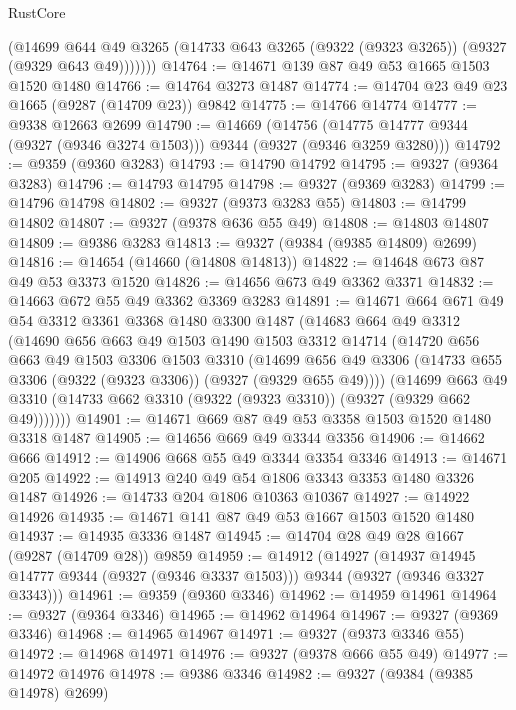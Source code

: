 \begin{lexlean}{RustCore}
\begin{coremodule}
          (@14699
            @644
            @49
            @3265
            (@14733 @643 @3265 (@9322 (@9323 @3265)) (@9327 (@9329 @643 @49)))))))
@14764 := @14671 @139 @87 @49 @53 @1665 @1503 @1520 @1480
@14766 := @14764 @3273 @1487
@14774 := @14704 @23 @49 @23 @1665 (@9287 (@14709 @23)) @9842
@14775 := @14766 @14774
@14777 := @9338 @12663 @2699
@14790 := @14669
    (@14756 (@14775 @14777 @9344 (@9327 (@9346 @3274 @1503))) @9344 (@9327 (@9346 @3259 @3280)))
@14792 := @9359 (@9360 @3283)
@14793 := @14790 @14792
@14795 := @9327 (@9364 @3283)
@14796 := @14793 @14795
@14798 := @9327 (@9369 @3283)
@14799 := @14796 @14798
@14802 := @9327 (@9373 @3283 @55)
@14803 := @14799 @14802
@14807 := @9327 (@9378 @636 @55 @49)
@14808 := @14803 @14807
@14809 := @9386 @3283
@14813 := @9327 (@9384 (@9385 @14809) @2699)
@14816 := @14654 (@14660 (@14808 @14813))
@14822 := @14648 @673 @87 @49 @53 @3373 @1520
@14826 := @14656 @673 @49 @3362 @3371
@14832 := @14663 @672 @55 @49 @3362 @3369 @3283
@14891 := @14671
    @664
    @671
    @49
    @54
    @3312
    @3361
    @3368
    @1480
    @3300
    @1487
    (@14683
      @664
      @49
      @3312
      (@14690
        @656
        @663
        @49
        @1503
        @1490
        @1503
        @3312
        @14714
        (@14720
          @656
          @663
          @49
          @1503
          @3306
          @1503
          @3310
          (@14699 @656 @49 @3306 (@14733 @655 @3306 (@9322 (@9323 @3306)) (@9327 (@9329 @655 @49))))
          (@14699
            @663
            @49
            @3310
            (@14733 @662 @3310 (@9322 (@9323 @3310)) (@9327 (@9329 @662 @49)))))))
@14901 := @14671 @669 @87 @49 @53 @3358 @1503 @1520 @1480 @3318 @1487
@14905 := @14656 @669 @49 @3344 @3356
@14906 := @14662 @666
@14912 := @14906 @668 @55 @49 @3344 @3354 @3346
@14913 := @14671 @205
@14922 := @14913 @240 @49 @54 @1806 @3343 @3353 @1480 @3326 @1487
@14926 := @14733 @204 @1806 @10363 @10367
@14927 := @14922 @14926
@14935 := @14671 @141 @87 @49 @53 @1667 @1503 @1520 @1480
@14937 := @14935 @3336 @1487
@14945 := @14704 @28 @49 @28 @1667 (@9287 (@14709 @28)) @9859
@14959 := @14912
    (@14927
      (@14937 @14945 @14777 @9344 (@9327 (@9346 @3337 @1503)))
      @9344
      (@9327 (@9346 @3327 @3343)))
@14961 := @9359 (@9360 @3346)
@14962 := @14959 @14961
@14964 := @9327 (@9364 @3346)
@14965 := @14962 @14964
@14967 := @9327 (@9369 @3346)
@14968 := @14965 @14967
@14971 := @9327 (@9373 @3346 @55)
@14972 := @14968 @14971
@14976 := @9327 (@9378 @666 @55 @49)
@14977 := @14972 @14976
@14978 := @9386 @3346
@14982 := @9327 (@9384 (@9385 @14978) @2699)

\end{coremodule}
\end{lexlean}
